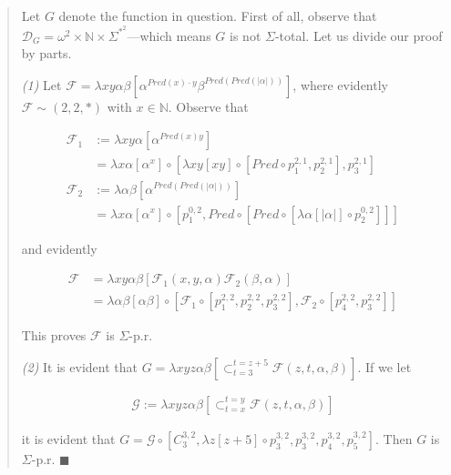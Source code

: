 \documentclass[a4paper, 12pt]{article}
\begin{document}
\begin{quote}
Let $G$ denote the function in question. First of all, observe that
$\mathcal{D}_G = \omega^2  \times \mathbb{N} \times \Sigma^{*}^2$---which means
$G$ is not $\Sigma$-total. Let us divide our proof by parts. 

\textit{(1)} Let $\mathcal{F} = \lambda xy \alpha \beta \left[ \alpha^{Pred(x)
\cdot y} \beta^{Pred(Pred(|\alpha|))} \right] $, where evidently $\mathcal{F}
\sim (2, 2, *)$ with $x \in \mathbb{N}$. Observe that 

\begin{align*}
    \mathcal{F}_1 &:= \lambda
    xy \alpha \left[ \alpha^{Pred(x)y} \right]\\ &= \lambda x\alpha \left[ \alpha^{x}
    \right] \circ \left[ \lambda xy\left[ xy \right] \circ \left[Pred \circ
    p_{1}^{2, 1}, p_{2}^{2, 1}\right], p_3^{2, 1} \right]   \\ 
    \mathcal{F}_2 &:= \lambda \alpha \beta \left[ \alpha^{Pred(Pred(|\alpha|))}
        \right] \\&= \lambda x\alpha[\alpha^x] \circ \left[ p_1^{0, 2}, Pred \circ
    \left[ Pred \circ \left[ \lambda \alpha [|\alpha|] \circ p_2^{0, 2} \right]  \right]  \right] 
\end{align*}

and evidently 

\begin{align*}
    \mathcal{F} &= \lambda xy\alpha\beta [\mathcal{F}_1(x, y, \alpha)
    \mathcal{F}_2(\beta, \alpha)]\\ &= \lambda \alpha\beta [\alpha\beta] \circ \left[
\mathcal{F}_1 \circ \left[ p_1^{2, 2}, p_2^{2, 2}, p_3^{2, 2} \right],
\mathcal{F}_2 \circ \left[ p_4^{2, 2}, p_3^{2, 2} \right]   \right]
\end{align*}

This proves $\mathcal{F}$ is $\Sigma$-p.r. 

\textit{(2)} It is evident that $G = \lambda xyz \alpha \beta
\left[\mathop{\subset}_{t=3}^{t=z+5} \mathcal{F}(z,
t, \alpha, \beta )\right]$. If we let 

\begin{align*}
    \mathcal{G} := \lambda xyz \alpha\beta \left[ \mathop{\subset}_{t=x}^{t=y}
    \mathcal{F} (z, t, \alpha, \beta)\right] 
\end{align*}

it is evident that $G = \mathcal{G} \circ \left[ C_{3}^{3, 2}, \lambda z [z + 5]
    \circ p_3^{3, 2},
p_3^{3, 2}, p_4^{3, 2}, p_5^{3, 2} \right] $. Then $G$ is $\Sigma$-p.r. $\blacksquare$

\end{quote}
\normalsize
\end{document}
